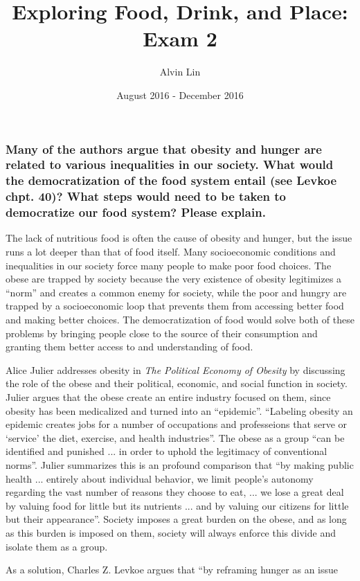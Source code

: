\documentclass{article}
\title{Exploring Food, Drink, and Place: Exam 2}
\author{Alvin Lin}
\date{August 2016 - December 2016}
\begin{document}
\maketitle

\subsubsection*{Many of the authors argue that obesity and hunger are related
to various inequalities in our society. What would the democratization of the
food system entail (see Levkoe chpt. 40)? What steps would need to be taken to
democratize our food system? Please explain.}
The lack of nutritious food is often the cause of obesity and hunger, but the
issue runs a lot deeper than that of food itself. Many socioeconomic conditions
and inequalities in our society force many people to make poor food choices.
The obese are trapped by society because the very existence of obesity
legitimizes a ``norm'' and creates a common enemy for society, while the poor
and hungry are trapped by a socioeconomic loop that prevents them from
accessing better food and making better choices. The democratization of food
would solve both of these problems by bringing people close to the source of
their consumption and granting them better access to and understanding of
food.\par
Alice Julier addresses obesity in \textit{The Political Economy of Obesity}
by discussing the role of the obese and their political, economic, and social
function in society. Julier argues that the obese create an entire industry
focused on them, since obesity has been medicalized and turned into an
``epidemic''. ``Labeling obesity an epidemic creates jobs for a number of
occupations and professeions that serve or `service' the diet, exercise, and
health industries''. The obese as a group ``can be identified and punished ...
in order to uphold the legitimacy of conventional norms''. Julier summarizes
this is an profound comparison that ``by making public health ... entirely about
individual behavior, we limit people's autonomy regarding the vast number of
reasons they choose to eat, ... we lose a great deal by valuing food for little
but its nutrients ... and by valuing our citizens for little but their
appearance''. Society imposes a great burden on the obese, and as long
as this burden is imposed on them, society will always enforce this divide and
isolate them as a group. \par
As a solution, Charles Z. Levkoe argues that ``by reframing hunger as an issue
\end{document}
